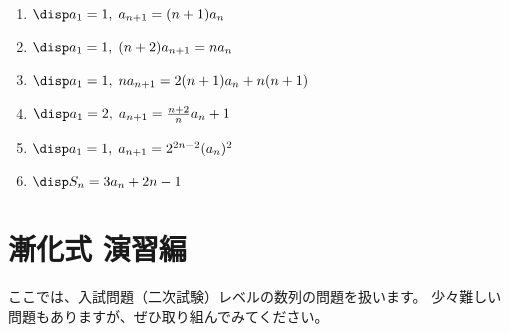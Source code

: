\documentclass[a4paper]{ltjsarticle}
\begin{document}
\begin{question*}
\begin{enumerate}[label=\arabic*.]
  \item $\disp a_1 = 1,\; a_{n+1}=(n+1)a_n$\\

  \item $\disp a_1 = 1,\; (n+2)a_{n+1}=na_n$\\

  \item $\disp a_1 = 1,\; na_{n+1}=2(n+1)a_n+n(n+1)$\\

  \item $\disp a_1 = 2,\; a_{n+1} = \frac{n+2}{n} a_n + 1$\\

  \item $\disp a_1 = 1,\; a_{n+1} = 2^{2n-2}(a_n)^2$\\

  \item $\disp S_n = 3a_n + 2n - 1$

\end{enumerate}
\end{question*}


\clearpage
\section{漸化式 演習編}
ここでは、入試問題（二次試験）レベルの数列の問題を扱います。
少々難しい問題もありますが、ぜひ取り組んでみてください。
\end{document}
